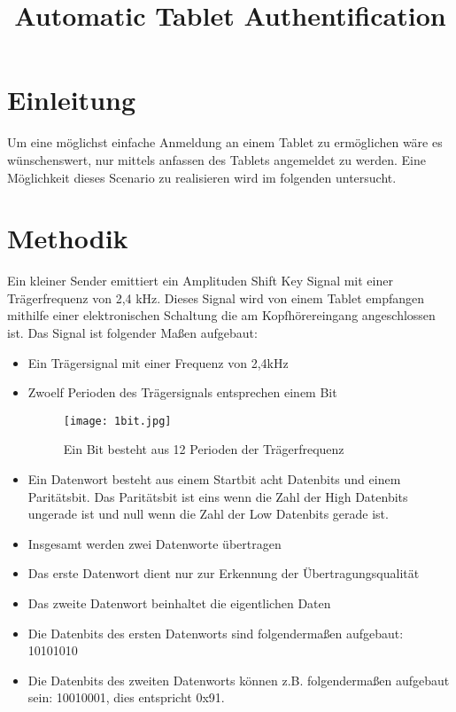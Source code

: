 \documentclass[10pt]{article}
\begin{document}
\title{Automatic Tablet Authentification}
\part{Einleitung}
Um eine möglichst einfache Anmeldung an einem Tablet zu ermöglichen wäre es wünschenswert, nur mittels anfassen des Tablets angemeldet zu werden. Eine Möglichkeit dieses Scenario zu realisieren wird im folgenden untersucht.
\part{Methodik}
Ein kleiner Sender emittiert ein Amplituden Shift Key Signal mit einer Trägerfrequenz von 2,4 kHz. Dieses Signal wird von einem Tablet empfangen mithilfe einer elektronischen Schaltung die am Kopfhörereingang angeschlossen ist. Das Signal ist folgender Maßen aufgebaut:
\begin{itemize}
\item Ein Trägersignal mit einer Frequenz von 2,4kHz
\item Zwoelf Perioden des Trägersignals entsprechen einem Bit
\begin{figure}[h!]
	\centering
	\texttt{[image: 1bit.jpg]}
	\caption{Ein Bit besteht aus 12 Perioden der Trägerfrequenz}
	\label{img:1bit}
\end{figure}
\item Ein Datenwort besteht aus einem Startbit acht Datenbits und einem Paritätsbit. Das Paritätsbit ist eins wenn die Zahl der High Datenbits ungerade ist und null wenn die Zahl der Low Datenbits gerade ist.
\item Insgesamt werden zwei Datenworte übertragen
\item Das erste Datenwort dient nur zur Erkennung der Übertragungsqualität
\item Das zweite Datenwort beinhaltet die eigentlichen Daten
\item Die Datenbits des ersten Datenworts sind folgendermaßen aufgebaut: 10101010
\item Die Datenbits des zweiten Datenworts können z.B. folgendermaßen aufgebaut sein: 10010001, dies entspricht 0x91.
\end{itemize}
\end{document}
